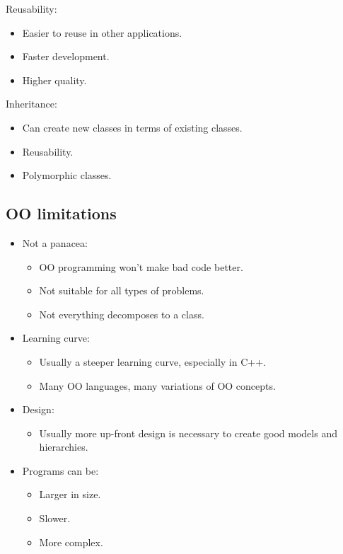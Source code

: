 Reusability:
\begin{itemize}
    \item Easier to reuse in other applications.
    \item Faster development.
    \item Higher quality.
\end{itemize}

Inheritance:
\begin{itemize}
    \item Can create new classes in terms of existing classes.
    \item Reusability.
    \item Polymorphic classes.
\end{itemize}

\subsection{OO limitations}
\begin{itemize}
    \item Not a panacea:
        \begin{itemize}
            \item OO programming won't make bad code better.
            \item Not suitable for all types of problems.
            \item Not everything decomposes to a class.
        \end{itemize}
    
    \item Learning curve:
        \begin{itemize}
            \item Usually a steeper learning curve, especially in C++.
            \item Many OO languages, many variations of OO concepts.
        \end{itemize}
    
    \item Design:
        \begin{itemize}
            \item Usually more up-front design is necessary to create good models and hierarchies.
        \end{itemize}
    
    \item Programs can be:
        \begin{itemize}
            \item Larger in size.
            \item Slower.
            \item More complex.
        \end{itemize}
\end{itemize}


